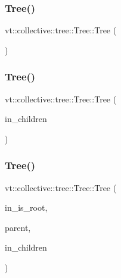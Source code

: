 \subsubsection{\texorpdfstring{Tree()}{Tree()}\hspace{0.1cm}{\footnotesize\ttfamily [1/3]}}
{\footnotesize\ttfamily vt\+::collective\+::tree\+::\+Tree\+::\+Tree (\begin{DoxyParamCaption}\item[{Default\+Tree\+Construct\+Tag}]{ }\end{DoxyParamCaption})\hspace{0.3cm}{\ttfamily [explicit]}}

\mbox{\label{structvt_1_1collective_1_1tree_1_1_tree_ad759f716890ce5344a6c6053fcdc7055}} 
\subsubsection{\texorpdfstring{Tree()}{Tree()}\hspace{0.1cm}{\footnotesize\ttfamily [2/3]}}
{\footnotesize\ttfamily vt\+::collective\+::tree\+::\+Tree\+::\+Tree (\begin{DoxyParamCaption}\item[{\hyperlink{structvt_1_1collective_1_1tree_1_1_tree_a834e7b54ea2dceae42db7c5ea859753f}{Node\+List\+Type} const \&}]{in\+\_\+children }\end{DoxyParamCaption})\hspace{0.3cm}{\ttfamily [explicit]}}

\mbox{\label{structvt_1_1collective_1_1tree_1_1_tree_a949f8b592559125bf225bd3828bd6b88}} 
\subsubsection{\texorpdfstring{Tree()}{Tree()}\hspace{0.1cm}{\footnotesize\ttfamily [3/3]}}
{\footnotesize\ttfamily vt\+::collective\+::tree\+::\+Tree\+::\+Tree (\begin{DoxyParamCaption}\item[{bool const}]{in\+\_\+is\+\_\+root,  }\item[{\hyperlink{namespacevt_a866da9d0efc19c0a1ce79e9e492f47e2}{Node\+Type} const \&}]{parent,  }\item[{\hyperlink{structvt_1_1collective_1_1tree_1_1_tree_a834e7b54ea2dceae42db7c5ea859753f}{Node\+List\+Type} const \&}]{in\+\_\+children }\end{DoxyParamCaption})}



